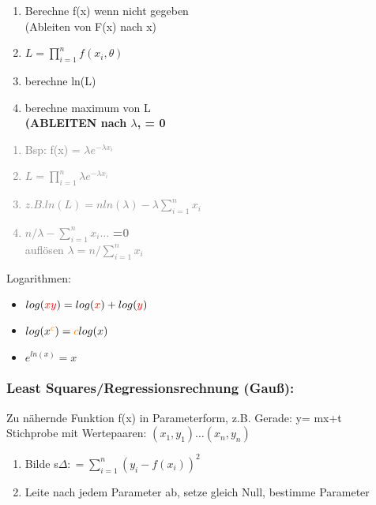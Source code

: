 \begin{minipage}{0.25\textwidth}
\begin{enumerate}
\item Berechne f(x) wenn nicht gegeben \\(Ableiten von F(x) nach x)
\item $L = \prod_{i=1}^n f(x_i,\theta)$
\item berechne ln(L) 
\item berechne maximum von L \\\textbf{(ABLEITEN nach $\lambda$, = 0 } 
\end{enumerate}
\end{minipage}
\begin{minipage}{0.25\textwidth}
\textcolor{gray}{
\begin{enumerate}
\item Bsp: f(x) = $\lambda e^ {-\lambda x_i}$\\
\item $ L = \prod_{i=1}^n \lambda e^ {-\lambda x_i}$
\item $	z.B. ln(L) = n ln(\lambda) -\lambda \sum_{i=1}^n x_i $
\item $n/\lambda - \sum_{i=1}^n x_i \dots$ \textbf{=0}\\
auflösen $\lambda = n/ \sum_{i=1}^n x_i$
\end{enumerate}}
\end{minipage}

\newcommand{\bc}{\textcolor{orange}{c}}
\newcommand{\red}[1]{\textcolor{red}{#1}}

Logarithmen:
\begin{itemize}
\item $log(\red{xy}) = log(\red{x}) + log(\red{y})$
\item $log(x^{\bc}) = \bc log(x)$
\item $e^{ln(x)} = x$
\end{itemize}

\newpage

\subsubsection*{Least Squares/Regressionsrechnung (Gauß):}
Zu nähernde Funktion f(x) in Parameterform, z.B. Gerade: y= mx+t\\
Stichprobe mit Wertepaaren: $(x_1,y_1)\dots (x_n,y_n)$

\begin{enumerate}
\item Bilde s$\Delta : = \sum_{i=1}^n(y_i - f(x_i))^2$
\item Leite nach jedem Parameter ab, setze gleich Null, bestimme Parameter
\end{enumerate}

